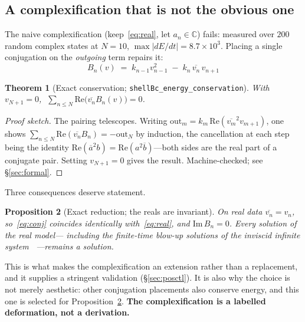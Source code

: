 \documentclass[11pt,a4paper]{article}
\newtheorem{theorem}{Theorem}
\newtheorem{proposition}[theorem]{Proposition}
\theoremstyle{definition}
\theoremstyle{remark}
\newcommand{\C}{\mathbb{C}}
\newcommand{\conj}[1]{\overline{#1}}
\newcommand{\lean}[1]{\texttt{\small #1}}
\begin{document}
\subsection{A complexification that is not the obvious one}

The naive complexification (keep~\eqref{eq:real}, let $a_n\in\C$) fails: measured over
$200$ random complex states at $N=10$, $\max|dE/dt| = 8.7\times10^3$. Placing a single
conjugation on the \emph{outgoing} term repairs it:
\begin{equation}
  \boxed{\;B_n(v) \;=\; k_{n-1}v_{n-1}^2 \;-\; k_n\,\conj{v_n}\,v_{n+1}\;}
  \label{eq:conj}
\end{equation}

\begin{theorem}[Exact conservation; \lean{shellBc\_energy\_conservation}]
\label{thm:conservation}
With $v_{N+1}=0$, $\;\sum_{n\le N}\mathrm{Re}\big(\conj{v_n}B_n(v)\big) = 0$.
\end{theorem}

\begin{proof}[Proof sketch]
The pairing telescopes. Writing $\mathrm{out}_m = k_m\,\mathrm{Re}(\conj{v_m}^2v_{m+1})$,
one shows $\sum_{n\le N}\mathrm{Re}(\conj{v_n}B_n) = -\mathrm{out}_N$ by induction, the
cancellation at each step being the identity
$\mathrm{Re}(\conj{a}^2b) = \mathrm{Re}(a^2\conj{b})$---both sides are the real part of a
conjugate pair. Setting $v_{N+1}=0$ gives the result. Machine-checked; see
\S\ref{sec:formal}.
\end{proof}

Three consequences deserve statement.

\begin{proposition}[Exact reduction; the reals are invariant]
\label{prop:real}
On real data $\conj{v_n}=v_n$, so~\eqref{eq:conj} coincides \emph{identically}
with~\eqref{eq:real}, and $\mathrm{Im}\,B_n = 0$. Every solution of the real model---%
including the finite-time blow-up solutions of the inviscid infinite system~%
\cite{KatzPavlovic2005}---remains a solution.
\end{proposition}

This is what makes the complexification an extension rather than a replacement, and it
supplies a stringent validation (\S\ref{sec:posctl}). It is also why the choice is not
merely aesthetic: other conjugation placements also conserve energy, and this one is
selected for Proposition~\ref{prop:real}. \textbf{The complexification is a labelled
deformation, not a derivation.}
\end{document}
